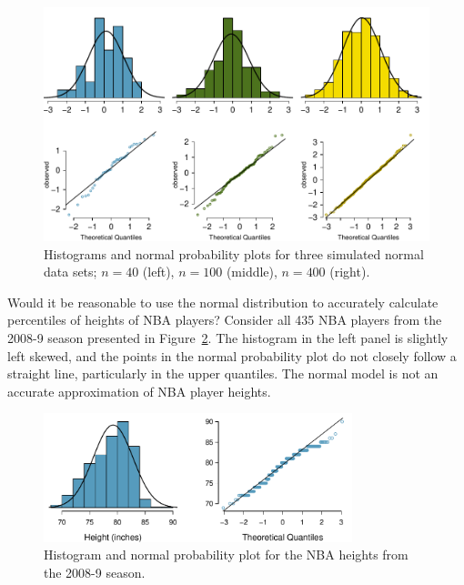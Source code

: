 \begin{figure}[h]
\centering
\includegraphics[width=\textwidth]{ch_distributions_oi_biostat/figures/normalExamples/normalExamples}
\caption{Histograms and normal probability plots for three simulated normal data sets; $n=40$ (left), $n=100$ (middle), $n=400$ (right).}
\label{normalExamples}
\end{figure}

\textD{\newpage}

\begin{examplewrap}
\begin{nexample}{Would it be reasonable to use the normal distribution to accurately calculate percentiles of heights of NBA players? Consider all 435 NBA players from the 2008-9 season presented in Figure~\ref{nbaNormal}.\footnotemark{}}
The histogram in the left panel is slightly left skewed, and the points in the normal probability plot do not closely follow a straight line, particularly in the upper quantiles. The normal model is not an accurate approximation of NBA player heights.
\end{nexample}
\end{examplewrap}

\begin{figure}[h]
	\centering
	\includegraphics[width=0.80\textwidth]{ch_distributions_oi_biostat/figures/nbaNormal/nbaNormal}
	\caption{Histogram and normal probability plot for the NBA heights from the 2008-9 season.}
	\label{nbaNormal}
\end{figure}		
		
